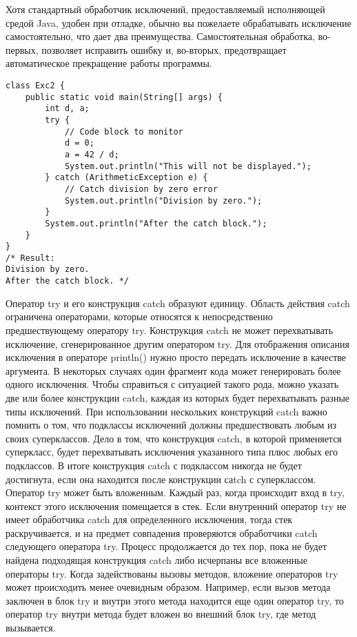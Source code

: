 Хотя стандартный обработчик исключений, предоставляемый исполняющей средой Java, удобен при отладке, обычно вы пожелаете обрабатывать исключение самостоятельно, что дает два преимущества. Самостоятельная обработка, во-первых, позволяет исправить ошибку и, во-вторых, предотвращает автоматическое прекращение работы программы.
\begin{lstlisting}
class Exc2 {
    public static void main(String[] args) {
        int d, a;
        try {
            // Code block to monitor
            d = 0;
            a = 42 / d;
            System.out.println("This will not be displayed.");
        } catch (ArithmeticException e) {
            // Catch division by zero error
            System.out.println("Division by zero.");
        }
        System.out.println("After the catch block.");
    }
}
/* Result:
Division by zero.
After the catch block. */
\end{lstlisting}
Оператор try и его конструкция catch образуют единицу. Область действия catch ограничена операторами, которые относятся к непосредственно предшествующему оператору try. Конструкция catch не может перехватывать исключение, сгенерированное другим оператором try. Для отображения описания исключения в операторе println() нужно просто передать исключение в качестве аргумента. В некоторых случаях один фрагмент кода может генерировать более одного исключения. Чтобы справиться с ситуацией такого рода, можно указать две или более конструкции catch, каждая из которых будет перехватывать разные типы исключений. При использовании нескольких конструкций catch важно помнить о том, что подклассы исключений должны предшествовать любым из своих суперклассов. Дело в том, что конструкция catch, в которой применяется суперкласс, будет перехватывать исключения указанного типа плюс любых его подклассов. В итоге конструкция catch с подклассом никогда не будет достигнута, если она находится после конструкции саtch с суперклассом. \\
Оператор try может быть вложенным. Каждый раз, когда происходит вход в try, контекст этого исключения помещается в стек. Если внутренний оператор try не имеет обработчика catch для определенного исключения, тогда стек раскручивается, и на предмет совпадения проверяются обработчики catch следующего оператора try. Процесс продолжается до тех пор, пока не будет найдена подходящая конструкция catch либо исчерпаны все вложенные операторы try. Когда задействованы вызовы методов, вложение операторов try может происходить менее очевидным образом. Например, если вызов метода заключен в блок try и внутри этого метода находится еще один оператор try, то оператор try внутри метода будет вложен во внешний блок try, где метод вызывается. \\
